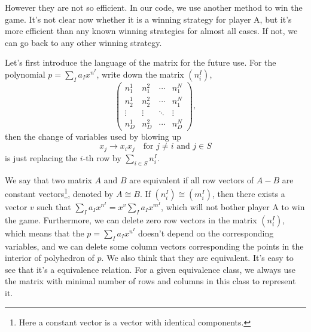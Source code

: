 \documentclass[12pt]{article}
\theoremstyle{definition}
\theoremstyle{plain}
\begin{document}
However they are not so efficient. In our code, we use another method to win the game.
It's not clear now whether it is a winning strategy for player A, but it's more efficient than
any known winning strategies for almost all cases. If not, we can go back to 
any other winning strategy. 

Let's first introduce the language of the matrix for the future use.
For the polynomial $p=\sum_I a_I x^{n^I}$, write down the matrix $(n^I_i)$, 
\[
\begin{pmatrix}
	n_1^1 & n_1^2 & \cdots & n_1^N\\
	n_2^1 & n_2^2 & \cdots & n_1^N\\
	\vdots & \vdots & \ddots & \vdots\\
	n_D^1 & n_D^2 & \cdots & n_D^N
\end{pmatrix},
\]
then the change of variables used by blowing up  
\[
	x_j\to x_ix_j \quad \text{for $j\neq i$ and $j\in S$}
\] 
is just replacing the $i$-th row by $\sum_{i\in S} n_i^I$.

We say that two matrix $A$ and $B$ are equivalent if all row vectors of $A-B$ are constant 
vectors\footnote{Here a constant vector is a vector with identical components.},
denoted by $A\cong B$. If $(n^I_i)\cong (m^I_i)$, then there exists a vector $v$ such that
$\sum_I a_I x^{n^I}=x^v\sum_I a_I x^{m^I}$, which will not bother player A to win the game.
Furthermore, we can delete zero row vectors in the matrix $(n^I_i)$, which means that the
$p=\sum_I a_I x^{n^I}$ doesn't depend on the corresponding variables, and 
we can delete some column vectors corresponding the points in the interior of polyhedron of $p$.
We also think that they are equivalent. It's easy to see that it's a equivalence relation.
For a given equivalence class, we always use the matrix with minimal number of rows and columns 
in this class to represent it.
\end{document}
